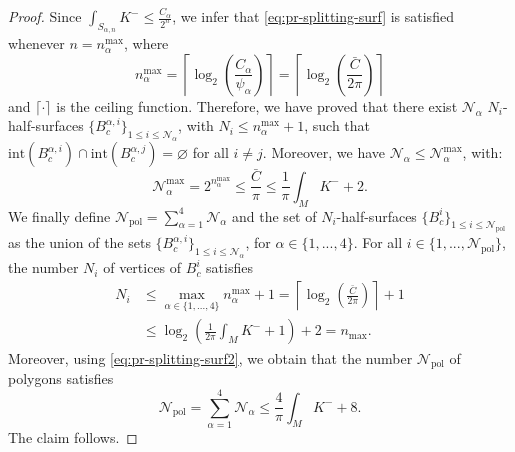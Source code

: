 \documentclass{article}
\newcommand{\surf}{M}
\newcommand{\HalfP}{S}
\newcommand{\halfP}{B}
\newcommand{\N}{\mathcal{N}}
\newcommand{\Npol}{\mathcal{N}_{\mathrm{pol}}}
\theoremstyle{remark}
\theoremstyle{prpart}
\begin{document}
\begin{proof}
Since $\int_{\HalfP_{\alpha,n}}K^-\leq \frac{C_\alpha}{2^n}$, we infer that \eqref{eq:pr-splitting-surf} is satisfied whenever $n=n_\alpha^{\max}$, where
\begin{equation*}
  n^{\mathrm{max}}_\alpha = \left\lceil\log_2\left(\frac{C_\alpha}{\psi_\alpha}\right)\right\rceil = \left\lceil\log_2\left(\frac{\bar C}{2\pi}\right)\right\rceil
\end{equation*}
and $\lceil\cdot\rceil$ is the ceiling function. Therefore, we have proved that there exist $\N_\alpha$ $N_i$-half-surfaces $\{\halfP_c^{\alpha,i}\}_{1\leq i\leq \N_\alpha}$, with $N_i\leq n^{\mathrm{max}}_\alpha+1$, such that $\mathrm{int}(\halfP_c^{\alpha,i})\cap \mathrm{int}(\halfP_c^{\alpha,j}) = \varnothing$ for all $i\neq j$. Moreover, we have $\N_\alpha\leq\N_\alpha^{\max}$, with:
\begin{equation}\label{eq:pr-splitting-surf2}
  \N_\alpha^{\max}=2^{n_\alpha^{\max}}\leq \frac{\bar C}{\pi}\leq \frac{1}{\pi}\int_\surf K^-+2.
\end{equation}
We finally define $\Npol = \sum_{\alpha=1}^4\N_\alpha$ and the set of $N_i$-half-surfaces $\{\halfP^i_c\}_{1\leq i\leq\Npol}$ as the union of the sets $\{\halfP_c^{\alpha,i}\}_{1\leq i\leq\N_\alpha}$, for $\alpha\in\{1,...,4\}$. For all $i\in\{1,...,\Npol\}$, the number $N_i$ of vertices of $B^i_c$ satisfies
\begin{align*}
N_i&\leq \max_{\alpha\in\{1,...,4\}}n^{\mathrm{max}}_\alpha+1=\left\lceil\log_2\left(\frac{\bar C}{2\pi}\right)\right\rceil+1\\
& \leq \log_2\left(\frac{1}{2\pi}\int_\surf K^-+1\right)+2=n_{\max}.
\end{align*}
Moreover, using \eqref{eq:pr-splitting-surf2}, we obtain that the number $\Npol$ of polygons satisfies
\begin{equation*}
  \Npol=\sum_{\alpha=1}^4\N_\alpha\leq \frac{4}{\pi}\int_\surf K^-+8.
\end{equation*}
The claim follows. %
\end{proof}
\end{document}
